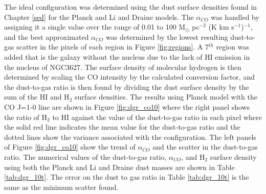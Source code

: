The ideal configuration was determined using the dust surface densities found in Chapter \ref{sed} for the Planck and Li and Draine models.  The $\alpha_{CO}$ was handled by assigning it a single value over the range of 0.01 to 100 M$_\odot$ pc$^{-2}$ (K km s$^{-1}$)$^{-1}$, and the best approximated $\alpha_{CO}$ was determined by the lowest resulting dust-to-gas scatter in the pixels of each region in Figure \ref{fig:regions}.  A 7$^{th}$ region was added that is the galaxy without the nucleus due to the lack of HI emission in the nucleus of NGC3627.  The surface density of molecular hydrogen is then determined by scaling the CO intensity by the calculated conversion factor, and the dust-to-gas ratio is then found by dividing the dust surface density by the sum of the HI and H$_2$ surface densities.  The results using Planck model with the CO J=1-0 line are shown in Figure \ref{fig:dgr_co10} where the right panel shows the ratio of H$_2$ to HI against the value of the dust-to-gas ratio in each pixel where the solid red line indicates the mean value for the dust-to-gas ratio and the dotted lines show the variance associated with the configuration.  The left panels of Figure \ref{fig:dgr_co10} show the trend of $\alpha_{CO}$ and the scatter in the dust-to-gas ratio.  The numerical values of the dust-to-gas ratio, $\alpha_{CO}$, and H$_2$ surface density using both the Planck and Li and Draine dust masses are shown in Table \ref{tab:dgr_10t}.  The error on the dust to gas ratio  in Table \ref{tab:dgr_10t} is the same as the minimum scatter found.

